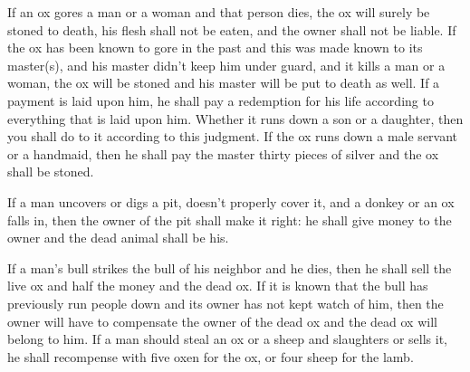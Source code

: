\begin{inparaenum}
   If an ox gores a man or a woman and that person dies, the ox will surely be stoned to death, his flesh shall not be eaten, and the owner shall not be liable.%
   If the ox has been known to gore in the past and this was made known to its master(s), and his master didn't keep him under guard, and it kills a man or a woman, the ox will be stoned and his master will be put to death as well.%
   If a payment is laid upon him, he shall pay a redemption for his life according to everything that is laid upon him.%
   Whether it runs down a son or a daughter, then you shall do to it according to this judgment.%
   If the ox runs down a male servant or a handmaid, then he shall pay the master thirty pieces of silver and the ox shall be stoned.%

   If a man uncovers or digs a pit, doesn't properly cover it, and a donkey or an ox falls in,%
   then the owner of the pit shall make it right: he shall give money to the owner and the dead animal shall be his.%

   If a man's bull strikes the bull of his neighbor and he dies, then he shall sell the live ox and half the money and the dead ox.%
   If it is known that the bull has previously run people down and its owner has not kept watch of him, then the owner will have to compensate the owner of the dead ox and the dead ox will belong to him.%
   If a man should steal an ox or a sheep and slaughters or sells it, he shall recompense with five oxen for the ox, or four sheep for the lamb.%
\end{inparaenum}
